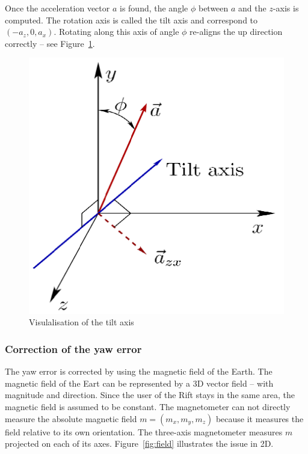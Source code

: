 \documentclass[12pt]{article}
\begin{document}
Once the acceleration vector $a$ is found, the angle $\phi$ between $a$ and the $z$-axis is computed. The rotation axis is called the tilt axis and correspond to $(-a_z, 0, a_x)$. Rotating along this axis of angle $\phi$ re-aligns the up direction correctly -- see Figure~\ref{fig:tilt}.

\begin{figure}[h]
  \centering
  \includegraphics[scale=0.2]{tilt.png}
  \caption{\label{fig:tilt} Visulalisation of the tilt axis}
\end{figure}

\subsubsection{Correction of the yaw error}
The yaw error is corrected by using the magnetic field of the Earth. The magnetic field of the Eart can be represented by a 3D vector field -- with magnitude and direction. Since the user of the Rift stays in the same area, the magnetic field is assumed to be constant. The magnetometer can not directly measure the absolute magnetic field $m = (m_x, m_y, m_z)$ because it measures the field relative to its own orientation. The three-axis magnetometer measures $m$ projected on each of its axes. Figure~\ref{fig:field} illustrates the issue in 2D.
\end{document}
